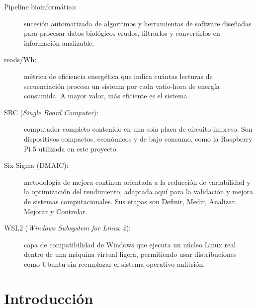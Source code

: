 \documentclass[12pt,oneside,spanish]{book}
\begin{document}
\begin{description}
        \item[Pipeline bioinformático:] sucesión automatizada de algoritmos y herramientas de software diseñadas para procesar datos biológicos crudos, filtrarlos y convertirlos en información analizable.
        
        \item[reads/Wh:] métrica de eficiencia energética que indica cuántas lecturas de secuenciación procesa un sistema por cada vatio-hora de energía consumida. A mayor valor, más eficiente es el sistema.
        
        \item[SBC (\textit{Single Board Computer}):] computador completo contenido en una sola placa de circuito impreso. Son dispositivos compactos, económicos y de bajo consumo, como la Raspberry Pi 5 utilizada en este proyecto.
        
        \item[Six Sigma (DMAIC):] metodología de mejora continua orientada a la reducción de variabilidad y la optimización del rendimiento, adaptada aquí para la validación y mejora de sistemas computacionales. Sus etapas son Definir, Medir, Analizar, Mejorar y Controlar.
        
        \item[WSL2 (\textit{Windows Subsystem for Linux 2}):] capa de compatibilidad de Windows que ejecuta un núcleo Linux real dentro de una máquina virtual ligera, permitiendo usar distribuciones como Ubuntu sin reemplazar el sistema operativo anfitrión.
    \end{description}
    
    
    \chapter*{Introducción}
    \setcounter{chapter}{0}
    \setcounter{equation}{0}
    \setcounter{figure}{0}
    \setcounter{table}{0}
    \setcounter{secnumdepth}{4} 
    \setcounter{tocdepth}{4}
    
\end{document}

